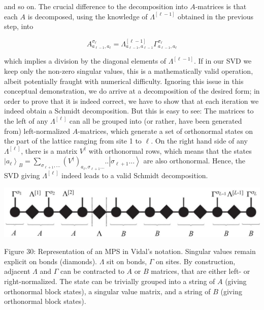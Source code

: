 \documentclass[12pt]{article}
\begin{document}
and so on. The crucial difference to the decomposition into $A$-matrices is that each $A$ is decomposed, using the knowledge of $\Lambda^{[\ell-1]}$ obtained in the previous step, into


\begin{equation*}
A_{a_{\ell-1}, a_{\ell}}^{\sigma_{\ell}}=\Lambda_{a_{\ell-1}, a_{\ell-1}}^{[\ell-1]} \Gamma_{a_{\ell-1}, a_{\ell}}^{\sigma_{\ell}} \tag{161}
\end{equation*}


which implies a division by the diagonal elements of $\Lambda^{[\ell-1]}$. If in our SVD we keep only the non-zero singular values, this is a mathematically valid operation, albeit potentially fraught with numerical difficulty. Ignoring this issue in this conceptual demonstration, we do arrive at a decomposition of the desired form; in order to prove that it is indeed correct, we have to show that at each iteration we indeed obtain a Schmidt decomposition. But this is easy to see: The matrices to the left of any $\Lambda^{[\ell]}$ can all be grouped into (or rather, have been generated from) left-normalized $A$-matrices, which generate a set of orthonormal states on the part of the lattice ranging from site 1 to $\ell$. On the right hand side of any $\Lambda^{[\ell]}$, there is a matrix $V^{\dagger}$ with orthonormal rows, which means that the states $\left|a_{\ell}\right\rangle_{B}=\sum_{\sigma_{\ell+1}, \ldots}\left(V^{\dagger}\right)_{a_{\ell}, \sigma_{\ell+1} \ldots} . .\left|\sigma_{\ell+1} \ldots\right\rangle$ are also orthonormal. Hence, the SVD giving $\Lambda^{[\ell]}$ indeed leads to a valid Schmidt decomposition.

\begin{center}
\includegraphics[max width=\textwidth]{2024_05_04_afc4ad226da9ccfe0ac8g-052}
\end{center}

Figure 30: Representation of an MPS in Vidal's notation. Singular values remain explicit on bonds (diamonds). $\Lambda$ sit on bonds, $\Gamma$ on sites. By construction, adjacent $\Lambda$ and $\Gamma$ can be contracted to $A$ or $B$ matrices, that are either left- or right-normalized. The state can be trivially grouped into a string of $A$ (giving orthonormal block states), a singular value matrix, and a string of $B$ (giving orthonormal block states).
\end{document}
